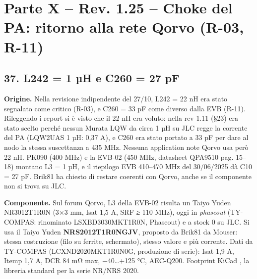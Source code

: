 \clearpage
\section[Parte X – Rev. 1.25 – Choke del PA: ritorno alla rete Qorvo (R-03, R-11)]{Parte X – Rev. 1.25 – Choke del PA: ritorno alla rete Qorvo (R-03, R-11)}

\subsection[37. L242 = 1 µH e C260 = 27 pF]{37. L242 = 1 µH e C260 = 27 pF}

\textbf{Origine.} Nella revisione indipendente del 27/\allowbreak{}10, L242 = 22 nH era stato segnalato come critico (R-03), e C260 = 33 pF come diverso dalla EVB (R-11). Rileggendo i report si è visto che il 22 nH era voluto: nella rev 1.11 (§23) era stato scelto perché nessun Murata LQW da circa 1 µH su JLC regge la corrente del PA (LQW2UAS 1 µH: 0,37 A), e C260 era stato portato a 33 pF per dare al nodo la stessa suscettanza a 435 MHz. Nessuna application note Qorvo usa però 22 nH. PK090 (400 MHz) e la EVB-02 (450 MHz, datasheet QPA9510 pag. 15–18) montano L3 = 1 µH, e il riepilogo EVB 410–470 MHz del 30/\allowbreak{}06/\allowbreak{}2025 dà C10 = 27 pF. Brik81 ha chiesto di restare coerenti con Qorvo, anche se il componente non si trova su JLC.

\textbf{Componente.} Sul forum Qorvo, L3 della EVB-02 risulta un Taiyo Yuden NR3012T1R0N (3×3 mm, Isat 1,5 A, SRF ≥ 110 MHz), oggi in \textit{phaseout} (TY-COMPAS: rinominato LSXBD3030MKT1R0N, Phaseout) e a stock 0 su JLC. Si usa il Taiyo Yuden \textbf{NRS2012T1R0NGJV}, proposto da Brik81 da Mouser: stessa costruzione (filo su ferrite, schermato), stesso valore e più corrente. Dati da TY-COMPAS (LCXND2020MKT1R0N0G, produzione di serie): Isat 1,9 A, Itemp 1,7 A, DCR 84 mΩ max, −40…+125 °C, AEC-Q200. Footprint KiCad , la libreria standard per la serie NR/\allowbreak{}NRS 2020.


